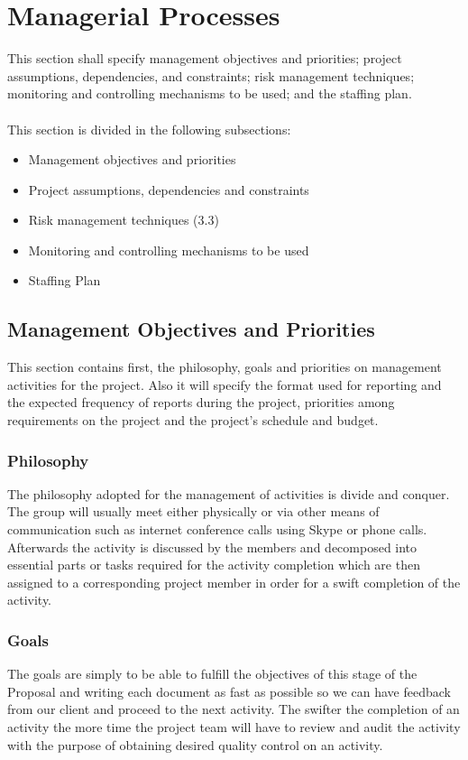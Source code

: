 \documentclass[12pt]{article}
\begin{document}
\section{Managerial Processes}
This section shall specify management objectives and priorities; project assumptions, dependencies, and constraints; risk management techniques; monitoring and controlling mechanisms to be used; and the staffing plan.\\\\
This section is divided in the following subsections:
\begin{itemize}
  \item Management objectives and priorities
  \item Project assumptions, dependencies and constraints
  \item Risk management techniques (3.3)
  \item Monitoring and controlling mechanisms to be used
  \item Staffing Plan
\end{itemize}

\subsection{Management Objectives and Priorities}
This section contains first, the philosophy, goals and priorities on management activities for the project. Also it will specify the format used for reporting and the expected frequency of reports during the project, priorities among requirements on the project and the project’s schedule and budget.

\subsubsection{Philosophy}
The philosophy adopted for the management of activities is divide and conquer. The group will usually meet either physically or via other means of communication such as internet conference calls using Skype or phone calls. Afterwards the activity is discussed by the members and decomposed into essential parts or tasks required for the activity completion which are then assigned to a corresponding project member in order for a swift completion of the activity.

\subsubsection{Goals}
The goals are simply to be able to fulfill the objectives of this stage of the Proposal and writing each document as fast as possible so we can have feedback from our client and proceed to the next activity. The swifter the completion of an activity the more time the project team will have to review and audit the activity with the purpose of obtaining desired quality control on an activity.
\end{document}
